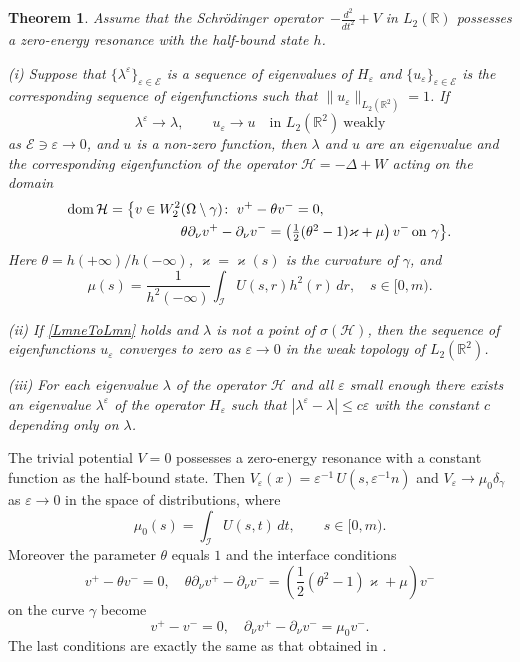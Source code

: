 \documentclass[reqno]{amsart}
\theoremstyle{plain}
\newtheorem{thm}{Theorem}
\numberwithin{equation}{section}
\newcommand{\dom}{\mathop{\rm dom}}
\renewcommand{\kappa}{\varkappa}
\newcommand{\Real}{\mathbb R}
\newcommand{\eps}{\varepsilon}
\newcommand{\cI}{\mathcal{I}}
\newcommand{\cE}{\mathcal{E}}
\newcommand{\lme}{\lambda^\eps}
\newcommand{\cH}{\mathcal{H}}
\renewcommand{\leq}{\leqslant}
\begin{document}
\begin{thm}\label{MainThrmRes}
Assume that the Schr\"odinger operator~$-\frac{d^2}{d t^2}+V$ in $L_2(\Real)$ possesses a zero-energy resonance with the half-bound state $h$.

(i) Suppose that $\{\lme\}_{\eps\in\cE}$ is a sequence of eigenvalues of $H_\eps$ and $\{u_\eps\}_{\eps\in\cE}$ is the corresponding sequence of  eigenfunctions such that $\|u_\eps\|_{L_2(\Real^2)}=1$. If
\begin{equation}\label{LmneToLmn}
  \lme \to \lambda, \qquad u_\eps \to u\quad \text{in } L_2(\Real^2) \   \text{weakly}
\end{equation}
as $\cE\ni\eps\to 0$,  and $u$ is a non-zero function, then $\lambda$ and $u$ are an eigenvalue and the corresponding eigenfunction of the operator $\cH=-\Delta +W$ acting on the domain
\begin{align*}
  \dom \cH=\big\{v\in W_2^2&(\Omega\setminus\gamma)\colon\;v^+-\theta v^-=0,\\  &\theta\partial_\nu v^+-\partial_\nu v^-
=\left(\textstyle\frac{1}{2 }(\theta^2-1)\kappa+\mu\right) v^-\,\text{on } \gamma \big\}.
\end{align*}
Here $\theta=h(+\infty)/h(-\infty)$, $\kappa=\kappa(s)$ is the  curvature of $\gamma$, and
\begin{equation}\label{Mu}
  \mu(s)=\frac{1}{h^2(-\infty)} \int_{\cI} U(s,r)h^2(r)\, dr,\quad s\in [0,m).
\end{equation}

(ii) If \eqref{LmneToLmn} holds and $\lambda$ is not a point of  $\sigma(\cH)$, then the sequence of eigenfunctions $u_\eps$ converges to zero as $\eps\to 0$ in the weak topology of  $L_2(\Real^2)$.

(iii) For each eigenvalue $\lambda$ of the operator $\cH$ and  all $\eps$ small enough there exists an eigenvalue $\lme$ of the operator $H_\eps$ such that
$|\lme-\lambda|\leq c\eps$
with the constant $c$ depending only on $\lambda$.
\end{thm}

The trivial potential $V=0$ possesses a zero-energy resonance with a constant function as  the half-bound state. Then $V_\eps(x) =\eps^{-1}\,U\left(s,\eps^{-1}n\right)$ and
$V_\eps\to \mu_0 \delta_\gamma$ as $\eps\to 0$ in the space of distributions, where
\begin{equation}\label{Mu0}
  \mu_0(s)=\int_{\cI}U(s,t)\, dt,\qquad s\in [0,m).
\end{equation}
Moreover the parameter $\theta$ equals  $1$ and the interface conditions
\begin{equation}\label{ConnectedCond}
  v^+-\theta v^-=0,\quad \theta\partial_\nu v^+-\partial_\nu v^-
=\left(\textstyle\frac{1}{2 }(\theta^2-1)\kappa+\mu\right) v^-
\end{equation}
on the curve  $\gamma$ become
\begin{equation*}
  v^+- v^-=0, \quad \partial_\nu v^+-\partial_\nu v^-
=\mu_0 v^-.
\end{equation*}
The last conditions are exactly the same as that obtained in \cite{BehrndtExnerHolzmannLotoreichik2017}.
\end{document}
